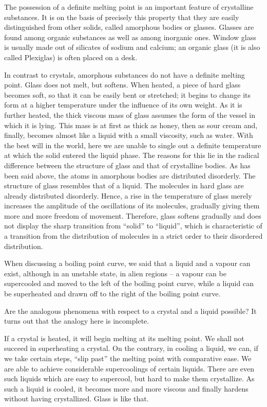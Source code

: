 The possession of a definite melting point is an important feature of crystalline substances. It is on the basis of precisely this property that they are easily distinguished from other solids, called amorphous bodies or glasses. Glasses are found among organic substances as well as among inorganic ones. Window glass is usually made out of silicates of sodium and calcium; an organic glass (it is also called Plexiglas) is often placed on a desk.

In contrast to crystals, amorphous substances do not have a definite melting point. Glass does not melt, but softens. When heated, a piece of hard glass becomes soft, so that it can be easily bent or stretched; it begins to change its form at a higher temperature under the influence of its own weight. As it is further heated, the thick viscous mass of glass assumes the form of the vessel in which it is lying. This mass is at first as thick as honey, then as sour cream and, finally, becomes almost like a liquid with a small viscosity, such as water. With the best will in the world, here we are unable to single out a definite temperature at which the solid entered the liquid phase. The reasons for this lie in the radical differ­ence between the structure of glass and that of crystalline bodies. As has been said above, the atoms in amor­phous bodies are distributed disorderly. The structure of glass resembles that of a liquid. The molecules in hard glass are already distributed disorderly. Hence, a rise in the temperature of glass merely increases the amplitude of the oscillations of its molecules, gradually giving them more and more freedom of movement. Therefore, glass softens gradually and does not display the sharp transition from ``solid'' to ``liquid'', which is char­acteristic of a transition from the distribution of mole­cules in a strict order to their disordered distribution.

When discussing a boiling point curve, we said that a liquid and a vapour can exist, although in an unstable state, in alien regions -- a vapour can be supercooled and moved to the left of the boiling point curve, while a liq­uid can be superheated and drawn off to the right of the boiling point curve.

Are the analogous phenomena with respect to a crystal and a liquid possible? It turns out that the analogy here is incomplete.

If a crystal is heated, it will begin melting at its melting point. We shall not succeed in superheating a crystal. On the contrary, in cooling a liquid, we can, if we take certain steps, ``slip past'' the melting point with compa­rative ease. We are able to achieve considerable supercool­ings of certain liquids. There are even such liquids which are easy to supercool, but hard to make them crystallize. As such a liquid is cooled, it becomes more and more vis­cous and finally hardens without having crystallized. Glass is like that.

